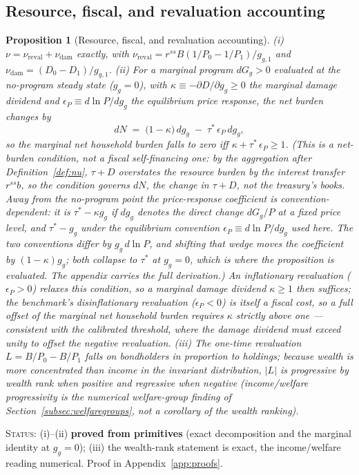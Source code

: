 \documentclass[12pt]{article}
\newtheorem{proposition}{Proposition}
\begin{document}
\subsection{Resource, fiscal, and revaluation accounting}

\begin{proposition}[Resource, fiscal, and revaluation accounting]\label{prop:selffinancing}
(i) $\nu=\nu_{\mathrm{reval}}+\nu_{\mathrm{dam}}$ exactly, with
$\nu_{\mathrm{reval}} = r^{ss}B(1/P_0-1/P_1)/g_{g,1}$ and
$\nu_{\mathrm{dam}}=(D_0-D_1)/g_{g,1}$.
(ii) For a marginal program $dG_g>0$ evaluated at the no-program steady
state ($g_g=0$), with
$\kappa \equiv -\partial D/\partial g_g \ge 0$ the marginal damage dividend
and $\epsilon_P \equiv d\ln P/dg_g$ the equilibrium price response, the net
burden changes by
\begin{equation}
dN \;=\; \big(1-\kappa\big)\,dg_g \;-\;
\tau^{*}\,\epsilon_P\, dg_g,
\label{eq:marginal}
\end{equation}
so the marginal \emph{net household burden} falls to zero iff
$\kappa + \tau^{*}\,\epsilon_P \ge 1$. (This is a net-burden condition, not a
fiscal self-financing one: by the aggregation after
Definition~\ref{def:nu}, $\tau+D$ overstates the resource burden by the
interest transfer $r^{ss}b$, so the condition governs $dN$, the change in
$\tau+D$, not the treasury's books. Away from the no-program point the
price-response coefficient is convention-dependent: it is $\tau^{*}-\kappa g_g$
if $dg_g$ denotes the direct change $dG_g/P$ at a fixed price level, and
$\tau^{*}-g_g$ under the equilibrium convention $\epsilon_P\equiv d\ln P/dg_g$
used here. The two conventions differ by $g_g\,d\ln P$, and shifting that
wedge moves the coefficient by $(1-\kappa)g_g$; both collapse to $\tau^{*}$ at
$g_g=0$, which is where the proposition is evaluated. The appendix carries the
full derivation.)
An inflationary
revaluation ($\epsilon_P>0$) relaxes this condition, so a marginal damage
dividend $\kappa\ge1$ then suffices; the benchmark's disinflationary
revaluation ($\epsilon_P<0$) is itself a fiscal cost, so a full offset of the marginal net household burden
requires $\kappa$ strictly above one --- consistent with the calibrated
threshold, where the damage dividend must exceed unity to offset the
negative revaluation.
(iii) The one-time revaluation $L=B/P_0-B/P_1$ falls on bondholders in
proportion to holdings; because wealth is more concentrated than income in
the invariant distribution, $|L|$ is progressive by wealth rank when
positive and regressive when negative (income/welfare progressivity is the
numerical welfare-group finding of Section~\ref{subsec:welfaregroups}, not a
corollary of the wealth ranking).
\end{proposition}
\noindent\textsc{Status:} (i)--(ii) \textbf{proved from primitives} (exact
decomposition and the marginal identity at $g_g=0$); (iii) the wealth-rank
statement is exact, the income/welfare reading numerical. Proof in
Appendix~\ref{app:proofs}.
\end{document}
